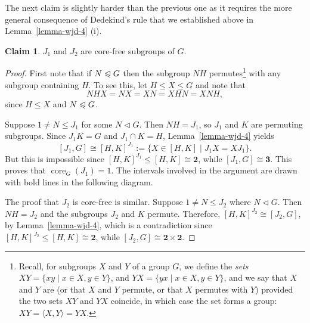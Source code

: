 \documentclass[11pt]{amsart}
\theoremstyle{plain}
\theoremstyle{definition}
\newcounter{claim}
\newtheorem{claim}[claim]{Claim}
\theoremstyle{remark}
\numberwithin{theorem}{section}
\numberwithin{claim}{section}
\numberwithin{equation}{section}
\numberwithin{conjecture}{section}
\newcommand{\<}{\ensuremath{\langle}}
\renewcommand{\>}{\ensuremath{\rangle}}
\renewcommand{\leq}{\ensuremath{\leqslant}}
\newcommand{\ssubnormal}{\ensuremath{\vartriangleleft}}
\newcommand{\subnormal}{\ensuremath{\trianglelefteqslant}}
\newcommand{\core}{\ensuremath{\operatorname{core}}}
\newcommand{\0}{\ensuremath{\mathbf{0}}}
\newcommand{\1}{\ensuremath{\mathbf{1}}}
\newcommand{\2}{\ensuremath{\mathbf{2}}}
\newcommand{\3}{\ensuremath{\mathbf{3}}}
\newcommand{\4}{\ensuremath{\mathbf{4}}}
\newcommand{\5}{\ensuremath{\mathbf{5}}}
\newcommand{\two}{\ensuremath{\mathbf{2}}}
\begin{document}
The next claim is slightly harder than the previous one as it requires the
more general consequence of Dedekind's rule that we established above in
Lemma~\ref{lemma-wjd-4} (i). 
\begin{claim}
$J_1$ and $J_2$ are core-free subgroups of $G$.
\end{claim}
\begin{proof}
First note that if $N\subnormal G$ then the subgroup $NH$
permutes\footnote{Recall, for subgroups $X$ and $Y$ of a group $G$, we define
  the \emph{sets} $XY = \{xy\mid x\in X, y \in Y\}$, and
  $YX = \{yx\mid x\in X, y \in Y\}$, and 
we say that $X$ and $Y$ are  (or that $X$ and $Y$
permute, or that $X$ permutes with $Y$)
 provided the two sets $XY$ and $YX$ coincide, in which case the set forms a group:
$XY = \<X,Y\> = YX$.}
with any subgroup
containing $H$.  To see this, let $H \leq X \leq G$ and note that
\[
  NHX = NX = XN= XHN = XNH,
\]
since $H \leq X$ and $N\subnormal G$.

Suppose $1\neq N\leq J_1$ for some $N \ssubnormal G$. Then $NH = J_1$, so $J_1$ and $K$ are
permuting subgroups.
Since $J_1K = G$ and $J_1\cap K = H$,
Lemma~\ref{lemma-wjd-4} yields
\[
[J_1, G] \cong [H, K]^{J_1} := \{X \in[H, K] \mid J_1X=XJ_1 \}.
\]
But this is impossible since $[H, K]^{J_1} \leq [H,  K] \cong \2$, while $[J_1, G]\cong \3$.
This proves that $\core_G(J_1) = 1$.
The intervals involved in the argument are drawn with bold lines in the
following diagram.
\begin{center}
  {
 }
\end{center}

The proof 
that $J_2$ is core-free is similar.  Suppose
$1\neq N\leq J_2$ where $N \ssubnormal G$. Then $NH = J_2$ and the subgroups $J_2$ and $K$
permute.
Therefore, $[H, K]^{J_2} \cong [J_2, G]$, 
by Lemma~\ref{lemma-wjd-4},
which is a contradiction since
$[H, K]^{J_2} \leq [H,  K] \cong \2$, while $[J_2, G]\cong \two \times \two$.
\end{proof}
\end{document}
